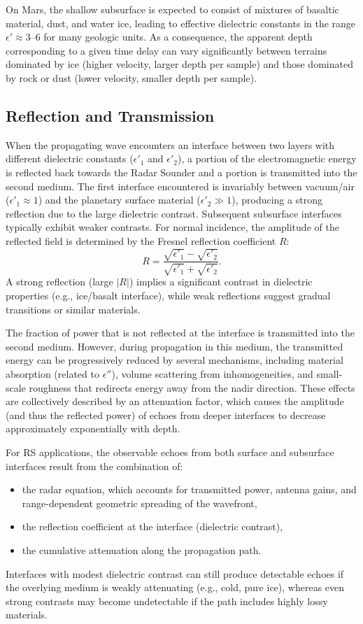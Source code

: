 On Mars, the shallow subsurface is expected to consist of mixtures of basaltic material, dust, and water ice, leading to effective dielectric constants in the range $\epsilon' \approx 3$–$6$ for many geologic units.
As a consequence, the apparent depth corresponding to a given time delay can vary significantly between terrains dominated by ice (higher velocity, larger depth per sample) and those dominated by rock or dust (lower velocity, smaller depth per sample).

\subsection{Reflection and Transmission}
When the propagating wave encounters an interface between two layers with different dielectric constants ($\epsilon'_1$ and $\epsilon'_2$), a portion of the electromagnetic energy is reflected back towards the Radar Sounder and a portion is transmitted into the second medium.
The first interface encountered is invariably between vacuum/air ($\epsilon'_1 \approx 1$) and the planetary surface material ($\epsilon'_2 \gg 1$), producing a strong reflection due to the large dielectric contrast.
Subsequent subsurface interfaces typically exhibit weaker contrasts.
For normal incidence, the amplitude of the reflected field is determined by the Fresnel reflection coefficient $R$:
\begin{equation}
R = \frac{\sqrt{\epsilon'_1} - \sqrt{\epsilon'_2}}{\sqrt{\epsilon'_1} + \sqrt{\epsilon'_2}}.
\end{equation}
A strong reflection (large $|R|$) implies a significant contrast in dielectric properties (e.g., ice/basalt interface), while weak reflections suggest gradual transitions or similar materials.

The fraction of power that is not reflected at the interface is transmitted into the second medium.
However, during propagation in this medium, the transmitted energy can be progressively reduced by several mechanisms, including material absorption (related to $\epsilon''$), volume scattering from inhomogeneities, and small-scale roughness that redirects energy away from the nadir direction.
These effects are collectively described by an attenuation factor, which causes the amplitude (and thus the reflected power) of echoes from deeper interfaces to decrease approximately exponentially with depth.

For RS applications, the observable echoes from both surface and subsurface interfaces result from the combination of:
\begin{itemize}
    \item the radar equation, which accounts for transmitted power, antenna gains, and range-dependent geometric spreading of the wavefront,
    \item the reflection coefficient at the interface (dielectric contrast),
    \item the cumulative attenuation along the propagation path.
\end{itemize}
Interfaces with modest dielectric contrast can still produce detectable echoes if the overlying medium is weakly attenuating (e.g., cold, pure ice), whereas even strong contrasts may become undetectable if the path includes highly lossy materials.

